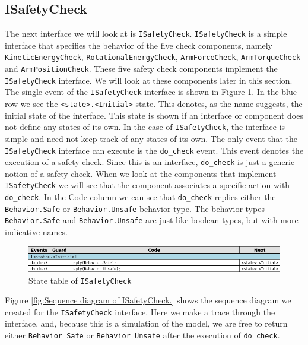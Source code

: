 \documentclass[12pt]{scrreprt}
\begin{document}
\begin{appendices}
\subsection{ISafetyCheck}
The next interface we will look at is \texttt{ISafetyCheck}. \texttt{ISafetyCheck} is a simple interface that specifies the behavior of the five check components, namely \texttt{KineticEnergyCheck}, \texttt{RotationalEnergyCheck}, \texttt{ArmForceCheck}, \texttt{ArmTorqueCheck} and \texttt{ArmPositionCheck}. These five safety check components implement the \texttt{ISafetyCheck} interface. We will look at these components later in this section. The single event of the \texttt{ISafetyCheck} interface is shown in Figure \ref{fig:ISafetyCheck_state_table}. In the blue row we see the \texttt{<state>.<Initial>} state. This denotes, as the name suggests, the initial state of the interface. This state is shown if an interface or component does not define any states of its own. In the case of \texttt{ISafetyCheck}, the interface is simple and need not keep track of any states of its own. The only event that the \texttt{ISafetyCheck} interface can execute is the \texttt{do\_check} event. This event denotes the execution of a safety check. Since this is an interface, \texttt{do\_check} is just a generic notion of a safety check. When we look at the components that implement \texttt{ISafetyCheck} we will see that the component associates a specific action with \texttt{do\_check}. In the Code column we can see that \texttt{do\_check} replies either the \texttt{Behavior.Safe} or \texttt{Behavior.Unsafe} behavior type. The behavior types \texttt{Behavior.Safe} and \texttt{Behavior.Unsafe} are just like boolean types, but with more indicative names.

\begin{figure}[H]
    \centering
    \includegraphics[width=\textwidth]{Figures/results/modelling_figures/ISafetyCheck/ISafetyCheck_state_table.png}
    \caption{State table of \texttt{ISafetyCheck}}
    \label{fig:ISafetyCheck_state_table}
\end{figure}

Figure \ref{fig:Sequence diagram of ISafetyCheck.} shows the sequence diagram we created for the \texttt{ISafetyCheck} interface. Here we make a trace through the interface, and, because this is a simulation of the model, we are free to return either \texttt{Behavior\_Safe} or \texttt{Behavior\_Unsafe} after the execution of \texttt{do\_check}.


\end{appendices}
\end{document}
